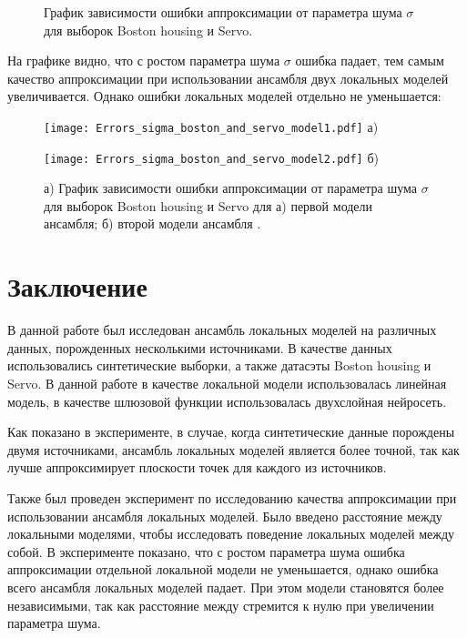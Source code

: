 \documentclass[12pt, twoside]{article}
\begin{document}
\begin{figure}[H]
\caption{График зависимости ошибки аппроксимации от параметра шума $\sigma$ для выборок Boston housing и Servo.}
\label{ris:image}
\end{figure}

На графике видно, что с ростом параметра шума $\sigma$ ошибка падает, тем самым качество аппроксимации при использовании ансамбля двух локальных моделей увеличивается. Однако ошибки локальных моделей отдельно не уменьшается:


\begin{figure}[h]
\begin{center}
\begin{minipage}[h]{0.49\linewidth}
\begin{center}\texttt{[image: Errors\_sigma\_boston\_and\_servo\_model1.pdf]}  а) \end{center}
\end{minipage}
\hfill
\begin{minipage}[h]{0.49\linewidth}
\begin{center}\texttt{[image: Errors\_sigma\_boston\_and\_servo\_model2.pdf]}  б) \end{center}
\end{minipage}
\caption{а) График зависимости ошибки аппроксимации от параметра шума $\sigma$ для выборок Boston housing и Servo для а) первой модели ансамбля; б) второй модели ансамбля .}
\label{ris:image1}
\end{center}
\end{figure}

\section{Заключение}

В данной работе был исследован ансамбль локальных моделей на различных данных, порожденных несколькими источниками. В качестве данных использовались синтетические выборки, а также датасэты Boston housing и Servo. В данной работе в качестве локальной модели использовалась линейная модель, в качестве шлюзовой функции использовалась двухслойная нейросеть. 

Как показано в эксперименте, в случае, когда синтетические данные порождены двумя источниками, ансамбль локальных моделей является более точной, так как лучше аппроксимирует плоскости точек для каждого из источников. 

Также был проведен эксперимент по исследованию качества аппроксимации при использовании ансамбля локальных моделей. Было введено расстояние между локальными моделями, чтобы исследовать поведение локальных моделей между собой. В эксперименте показано, что с ростом параметра шума ошибка аппроксимации отдельной локальной модели не уменьшается, однако ошибка всего ансамбля локальных моделей падает. При этом модели становятся более независимыми, так как расстояние между стремится к нулю при увеличении параметра шума. 
\end{document}
